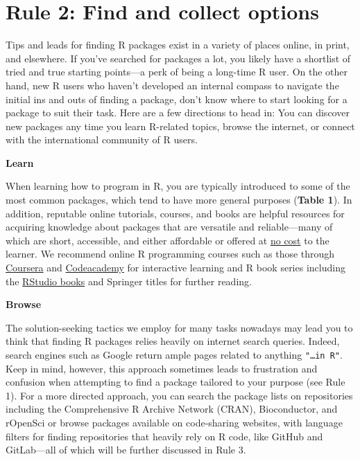 \documentclass[10pt,letterpaper]{article}
\begin{document}
\hypertarget{rule-2-find-and-collect-options}{%
\section{Rule 2: Find and collect
options}\label{rule-2-find-and-collect-options}}

Tips and leads for finding R packages exist in a variety of places
online, in print, and elsewhere. If you've searched for packages a lot,
you likely have a shortlist of tried and true starting points---a perk
of being a long-time R user. On the other hand, new R users who haven't
developed an internal compass to navigate the initial ins and outs of
finding a package, don't know where to start looking for a package to
suit their task. Here are a few directions to head in: You can discover
new packages any time you learn R-related topics, browse the internet,
or connect with the international community of R users.

\textbf{Learn}

When learning how to program in R, you are typically introduced to some
of the most common packages, which tend to have more general purposes
(\textbf{Table 1}). In addition, reputable online tutorials, courses,
and books are helpful resources for acquiring knowledge about packages
that are versatile and reliable---many of which are short, accessible,
and either affordable or offered at
\href{https://committedtotape.shinyapps.io/freeR/}{no cost} to the
learner. We recommend online R programming courses such as those through
\href{https://www.coursera.org/learn/r-programming}{Coursera} and
\href{https://www.codecademy.com/learn/learn-r}{Codeacademy} for
interactive learning and R book series including the
\href{https://rstudio.com/resources/books/}{RStudio books} and Springer
titles for further reading.

\textbf{Browse}

The solution-seeking tactics we employ for many tasks nowadays may lead
you to think that finding R packages relies heavily on internet search
queries. Indeed, search engines such as Google return ample pages
related to anything \texttt{"\ldots{}in\ R"}. Keep in mind, however,
this approach sometimes leads to frustration and confusion when
attempting to find a package tailored to your purpose (see Rule 1). For
a more directed approach, you can search the package lists on
repositories including the Comprehensive R Archive Network (CRAN),
Bioconductor, and rOpenSci or browse packages available on code-sharing
websites, with language filters for finding repositories that heavily
rely on R code, like GitHub and GitLab---all of which will be further
discussed in Rule 3.
\end{document}

